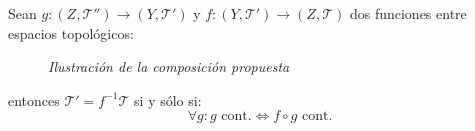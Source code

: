 \begin{theo}
Sean $g: \left( Z, \mathcal{T}'' \right) \rightarrow \left( Y, \mathcal{T}' \right)$ y $f: \left( Y, \mathcal{T}' \right) \rightarrow \left( Z, \mathcal{T} \right)$ dos funciones entre espacios topológicos:
\begin{figure}[H]
        \centering    
        \caption{\textit{Ilustración de la composición propuesta}}
        \label{prop_universal_inmersiones}
    \end{figure}
entonces $\mathcal{T}' = f^{-1}\mathcal{T}$ si y sólo si:
\[
\forall g: g \text{ cont.} \Leftrightarrow f \circ g \text{ cont.}
\]    
\end{theo}
